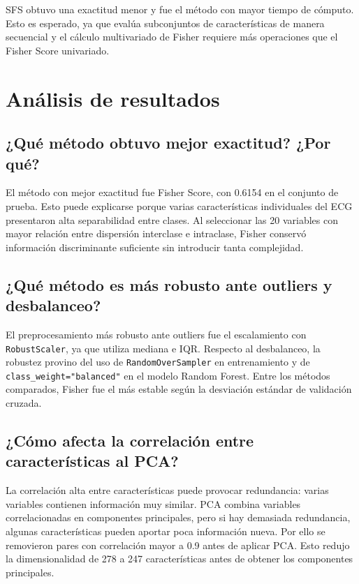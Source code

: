 \documentclass{article}
\begin{document}
SFS obtuvo una exactitud menor y fue el método con mayor tiempo de cómputo. Esto es esperado, ya que evalúa subconjuntos de características de manera secuencial y el cálculo multivariado de Fisher requiere más operaciones que el Fisher Score univariado.

\section{Análisis de resultados}

\subsection*{¿Qué método obtuvo mejor exactitud? ¿Por qué?}

El método con mejor exactitud fue Fisher Score, con 0.6154 en el conjunto de prueba. Esto puede explicarse porque varias características individuales del ECG presentaron alta separabilidad entre clases. Al seleccionar las 20 variables con mayor relación entre dispersión interclase e intraclase, Fisher conservó información discriminante suficiente sin introducir tanta complejidad.

\subsection*{¿Qué método es más robusto ante outliers y desbalanceo?}

El preprocesamiento más robusto ante outliers fue el escalamiento con \texttt{RobustScaler}, ya que utiliza mediana e IQR. Respecto al desbalanceo, la robustez provino del uso de \texttt{RandomOverSampler} en entrenamiento y de \texttt{class\_weight="balanced"} en el modelo Random Forest. Entre los métodos comparados, Fisher fue el más estable según la desviación estándar de validación cruzada.

\subsection*{¿Cómo afecta la correlación entre características al PCA?}

La correlación alta entre características puede provocar redundancia: varias variables contienen información muy similar. PCA combina variables correlacionadas en componentes principales, pero si hay demasiada redundancia, algunas características pueden aportar poca información nueva. Por ello se removieron pares con correlación mayor a 0.9 antes de aplicar PCA. Esto redujo la dimensionalidad de 278 a 247 características antes de obtener los componentes principales.
\end{document}
